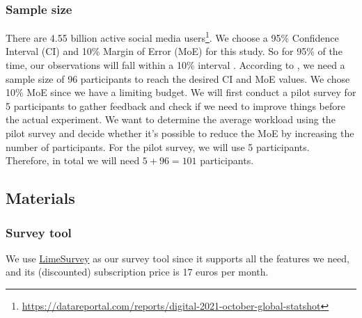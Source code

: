 \documentclass[a4paper]{article}
\begin{document}
\subsubsection{Sample size}
There are 4.55 billion active social media users\footnote{\url{https://datareportal.com/reports/digital-2021-october-global-statshot}}. We choose a 95\% Confidence Interval (CI) and 10\% Margin of Error (MoE) for this study. So for 95\% of the time, our observations will fall within a 10\% interval \cite{olson2014ways}. According to \cite{olson2014ways}, we need a sample size of 96 participants to reach the desired CI and MoE values. We chose 10\% MoE since we have a limiting budget. We will first conduct a pilot survey for 5 participants to gather feedback and check if we need to improve things before the actual experiment. We want to determine the average workload using the pilot survey and decide whether it's possible to reduce the MoE by increasing the number of participants. For the pilot survey, we will use 5 participants. Therefore, in total we will need $5+96 = 101$ participants.

\subsection{Materials}
\subsubsection{Survey tool}
We use \href{https://www.limesurvey.org}{LimeSurvey} as our survey tool since it supports all the features we need, and its (discounted) subscription price is 17 euros per month.
\end{document}
